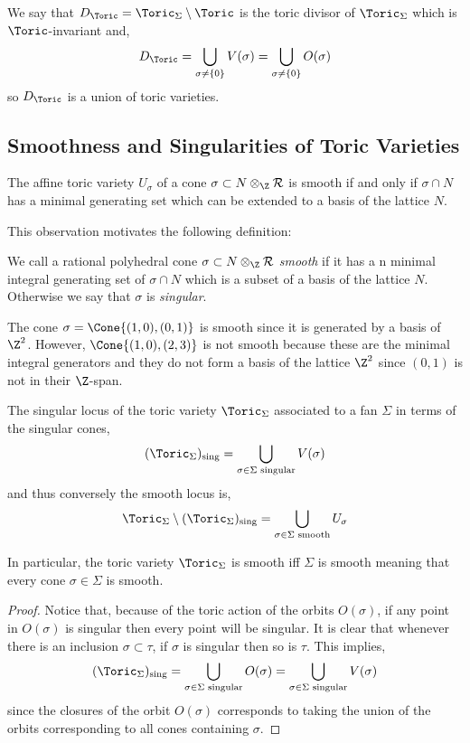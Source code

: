 \begin{rmk}
We say that $D_\Toric = \Toric_\Sigma \setminus \Toric$ is the toric divisor of $\Toric_\Sigma$ which is $\Toric$-invariant and,
\[ D_\Toric = \bigcup_{\sigma \neq \{0\}} V(\sigma) = \bigcup_{\sigma \neq \{0\}} O(\sigma) \]
so $D_\Toric$ is a union of toric varieties.
\end{rmk}


\subsection{Smoothness and Singularities of Toric Varieties}

\begin{lemma}
The affine toric variety $U_\sigma$ of a cone $\sigma \subset N \otimes_\Z \R$ is smooth if and only if $\sigma \cap N$ has a minimal generating set which can be extended to a basis of the lattice $N$.
\end{lemma}
\noindent
This observation motivates the following definition:

\begin{defn}
We call a rational polyhedral cone $\sigma \subset N \otimes_\Z \R$ \textit{smooth} if it has a n minimal integral generating set of $\sigma \cap N$ which is a subset of a basis of the lattice $N$. Otherwise we say that $\sigma$ is \textit{singular}.
\end{defn}


\begin{example}
The cone $\sigma = \Cone{(1, 0), (0, 1)}$ is smooth since it is generated by a basis of $\Z^2$. However, $\Cone{(1, 0), (2, 3)}$ is not smooth because these are the minimal integral generators and they do not form a basis of the lattice $\Z^2$ since $(0, 1)$ is not in their $\Z$-span.
\end{example}

\begin{lemma}
The singular locus of the toric variety $\Toric_\Sigma$ associated to a fan $\Sigma$ in terms of the singular cones,
\[ (\Toric_\Sigma)_{\text{sing}} = \bigcup_{\sigma \in \Sigma \text{ singular}} V(\sigma) \]
and thus conversely the smooth locus is,
\[ \Toric_{\Sigma} \setminus (\Toric_\Sigma)_{\text{sing}} = \bigcup_{\sigma \in \Sigma \text{ smooth}} U_\sigma \] 
\end{lemma}
\noindent
In particular, the toric variety $\Toric_\Sigma$ is smooth iff $\Sigma$ is smooth meaning that every cone $\sigma \in \Sigma$ is smooth. 

\begin{proof}
Notice that, because of the toric action of the orbits $O(\sigma)$, if any point in $O(\sigma)$ is singular then every point will be singular. It is clear that whenever there is an inclusion $\sigma \subset \tau$, if $\sigma$ is singular then so is $\tau$. This implies,
\[ (\Toric_\Sigma)_{\text{sing}} = \bigcup_{\sigma \in \Sigma \text{ singular}} O(\sigma) = \bigcup_{\sigma \in \Sigma \text{ singular}} V(\sigma) \]
since the closures of the orbit $O(\sigma)$ corresponds to taking the union of the orbits corresponding to all cones containing $\sigma$. 
\end{proof}

